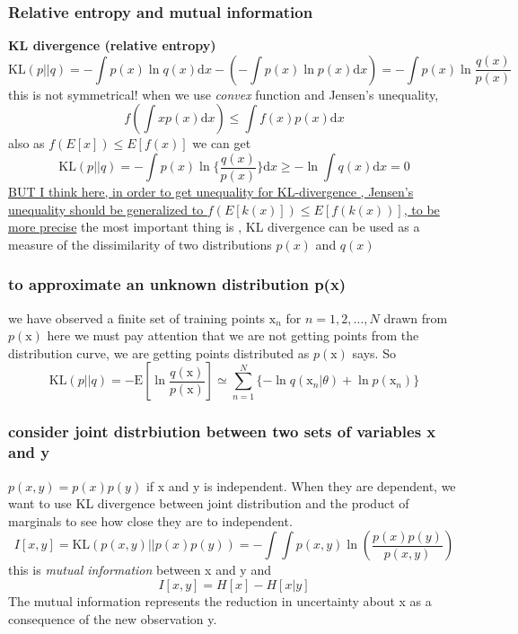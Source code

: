 \documentclass[a4paper]{book}
\begin{document}
\subsubsection{Relative entropy and mutual information}
\textbf{KL divergence (relative entropy)}
\begin{equation}\label{eq1.13}
  \mathrm {KL}(p||q) = -\int p(x)\ln q(x)\mathrm dx-(-\int p(x)\ln p(x)\mathrm dx) = -\int p(x)\ln \frac{q(x)}{p(x)}
\end{equation}
this is not symmetrical!\newline
when we use \emph{convex} function and Jensen's unequality,
\begin{equation}\label{eq1.14}
  f(\int xp(x)\mathrm  dx) \leq \int f(x)p(x) \mathrm dx
\end{equation}
also as $f(E[x]) \le E[f(x)]$ we can get
\begin{equation}\label{eq1.14}
  \mathrm  {KL}(p||q) = -\int p(x)\ln\{\frac{q(x)}{p(x)}\}\mathrm  dx \ge -\ln\int q(x)\mathrm  dx = 0
\end{equation}
\uline{BUT I think here, in order to get unequality for KL-divergence , Jensen's unequality should be generalized to $f(E[k(x)])\le E[f(k(x))]$, to be more precise}
the most important thing is , KL divergence can be used as a measure of the dissimilarity of two distributions $p(x)$ and $q(x)$
\subsubsection{to approximate an unknown distribution p(x)}
we have observed a finite set of training points $\mathrm x_n$ for $n=1,2,\dots,N$ drawn from $p(\mathrm  x)$
here we must pay attention that we are not getting points from the distribution curve, we are getting points distributed as $p(\mathrm  x)$ says.
So
\begin{equation}\label{eq1.15}
  \mathrm {KL}(p||q) = -\mathrm  E[\ln\frac{q(\mathrm x)}{p(\mathrm x)}]\simeq\sum_{n=1}^N\{-\ln q(\mathrm  x_n|\theta) +\ln p(\mathrm x_n)\}
\end{equation}
\subsubsection{consider joint distrbiution between two sets of variables x and y}
$p(x,y) = p(x)p(y)$ if x and y is independent.
When they are dependent, we want to use KL divergence between joint distribution and the product of marginals to see how close they are  to independent.
\begin{equation}\label{eq1.16}
  I[x,y] = \mathrm {KL}(p(x,y)||p(x)p(y)) = -\int\int p(x,y)\ln(\frac{p(x)p(y)}{p(x,y)})
\end{equation}
this is \emph{mutual information} between x and y  and
\begin{equation}\label{eq1.17}
I[x,y] = H[x]-H[x|y]
\end{equation}
The mutual information represents the reduction in uncertainty about x as a consequence of the new observation y.
\end{document}
